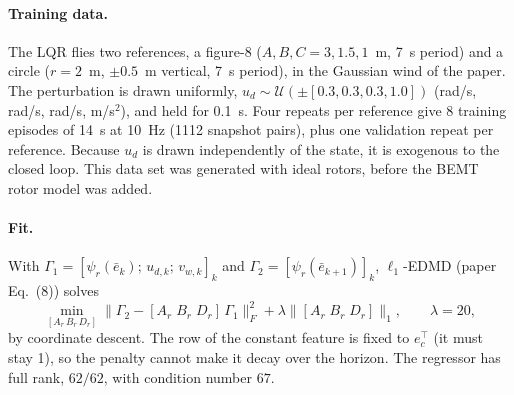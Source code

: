 \documentclass[11pt,a4paper]{article}
\begin{document}

	\paragraph{Training data.}
	The LQR flies two references, a figure-8 ($A, B, C = 3, 1.5, 1$~m, 7~s period) and a circle
	($r = 2$~m, $\pm 0.5$~m vertical, 7~s period), in the Gaussian wind of the paper. The
	perturbation is drawn uniformly, $u_d \sim \mathcal{U}(\pm[0.3, 0.3, 0.3, 1.0])$
	(rad/s, rad/s, rad/s, m/s$^2$), and held for 0.1~s. Four repeats per reference give
	8 training episodes of 14~s at 10~Hz (1112 snapshot pairs), plus one validation repeat per reference.
	Because $u_d$ is drawn independently of the state, it is exogenous to the closed loop.
	This data set was generated with ideal rotors, before the BEMT rotor model was added.

	\paragraph{Fit.}
	With $\Gamma_1 = [\psi_r(\bar{e}_k);\, u_{d,k};\, v_{w,k}]_k$ and
	$\Gamma_2 = [\psi_r(\bar{e}_{k+1})]_k$, $\ell_1$-EDMD (paper Eq.~(8)) solves
	\begin{equation}
		\min_{[A_r\, B_r\, D_r]} \bigl\| \Gamma_2 - [A_r\; B_r\; D_r]\,\Gamma_1 \bigr\|_F^2 + \lambda \bigl\| [A_r\; B_r\; D_r] \bigr\|_1,
		\qquad \lambda = 20,
	\end{equation}
	by coordinate descent. The row of the constant feature is fixed to $e_c^\top$ (it must stay 1),
	so the penalty cannot make it decay over the horizon. The regressor has full rank,
	$62/62$, with condition number $67$.
\end{document}
